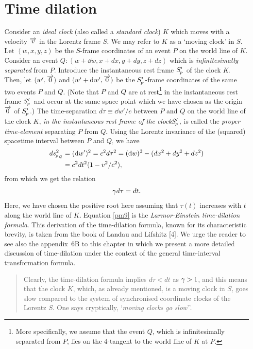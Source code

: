 \section{Time dilation}
Consider an \textsl{ideal clock} (also called a 
\textsl{standard clock}) $K$ which moves with a 
velocity 
$\overrightarrow{v}$ in the Lorentz frame $S$. {We may refer to  
$K$ as 
a  `moving clock' in $S$}. Let $(w,x,y,z)$ be the 
$S$-frame 
coordinates of an event $P$ on the world line of $K$. 
Consider  an event $Q: (w+\dd{w}, x+dx, y+dy, z+dz)$ 
which 
is \textsl{infinitesimally separated} from $P$. 
Introduce 
the instantaneous rest frame  $S'_{_{\hspace*{-1.5pt}{P}}}$  of the 
clock 
$K$. Then, let $(w',\overrightarrow{0})$ and $(w'+\mathrm{d}{w}', 
\overrightarrow{0})$ be 
the $S'_{_{\hspace*{-1.5pt}{P}}}$-frame coordinates of the same two 
events 
$P$ and $Q$. (Note that  $P$ and $Q$ are at 
rest\footnote{More specifically, we assume that the 
event 
$Q$, which is infinitesimally separated from $P$,  lies 
on 
the 4-tangent to the world line of $K$ at $P$.} in the 
instantaneous rest frame $S'_{_{\hspace*{-1.5pt}{P}}}$ and occur at the 
same 
space point which we have chosen as the origin 
$\overrightarrow{0}$ of 
$S'_{_{\hspace*{-1.5pt}{P}}}$.) {The time-separation} $d\tau\equiv 
\dd{w}'/c 
$ between $P$ and $Q$ on the world line of the clock 
$K$,  
\textsl{in the instantaneous rest frame of the 
clock}$S'_{_{\hspace*{-1.5pt}{P}}}$,  is called the \textsl{proper 
time-element} separating $P$ from $Q$. Using the 
Lorentz 
invariance of the (squared) spacetime interval between 
$P$ 
and $Q$, we have
\begin{align*}
 ds^2_{_{\hspace*{-1.5pt}{PQ}}}&=(\mathrm{d}{w}')^2=c^2d\tau^2=(\mathrm{d}{w})^2 -
 (dx^2+dy^2+dz^2) \notag\\&=  c^2dt^2(1-v^2/c^2),
\end{align*}
from which we get the relation
\begin{align}\label{pm9}
 {\gamma} d\tau=dt.
\end{align}
Here, we  have chosen the 
positive root here assuming that $\tau(t)$ increases 
with 
$t$ along the world line of $K$. Equation \eqref{pm9} 
is  
the \textsl{Larmor-Einstein time-dilation 
formula}. This derivation of the time-dilation 
formula, 
known for its characteristic brevity, is taken from 
the book of Landau and Lifshitz [4]. We urge the 
reader 
to see also the appendix~6B to this chapter in which 
we 
present a more detailed discussion of  time-dilation 
under 
the context of the general time-interval 
transformation 
formula.
\begin{quote}
Clearly, the time-dilation formula implies $d\tau < dt$ 
as 
${\gamma} >1$, and this means that the clock $K$, which, 
as 
already mentioned, is a moving clock in $S$, goes slow 
compared to the system of synchronised coordinate 
clocks of 
the Lorentz $S$. One says cryptically, 
`\textsl{moving clocks go slow}''. 
\end{quote}

